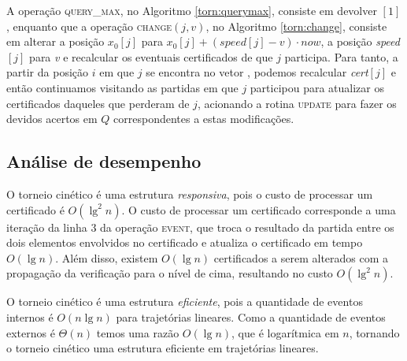



A operação \textsc{query\_max}, no Algoritmo \ref{torn:querymax},
consiste em devolver \torneio$[1]$, enquanto que a operação
\textsc{change}$(j, v)$, no Algoritmo \ref{torn:change}, consiste em
alterar a posição $x_0[j]$ para ${x_0[j] + (\mathit{speed}[j] -
v)\cdot now}$, a posição \textit{speed}$[j]$ para \textit{v} e
recalcular os eventuais certificados de que $j$ participa. Para
tanto, a partir da posição $i$ em que $j$ se encontra no vetor
\torneio, podemos recalcular \textit{cert}$[j]$ e então continuamos
visitando as partidas em que $j$ participou para atualizar os
certificados daqueles que perderam de $j$, acionando a rotina
\textsc{update} para fazer os devidos acertos em $Q$ correspondentes
a estas modificações.









\FloatBarrier
\subsection{Análise de desempenho}

O torneio cinético é uma estrutura \textit{responsiva}, pois o custo de
processar um certificado é $O(\lg^2{n})$. O custo de processar um certificado
corresponde a uma iteração da linha $3$ da operação \textsc{event}, que troca o
resultado da partida entre os dois elementos envolvidos no certificado e
atualiza o certificado em tempo $O(\lg{n})$. Além disso, existem $O(\lg{n})$
certificados a serem alterados com a propagação da verificação para o nível de
cima, resultando no custo $O(\lg^2{n})$.

O torneio cinético é uma estrutura \textit{eficiente}, pois a quantidade de
eventos internos é $O(n\lg{n})$ para trajetórias lineares. Como a quantidade de
eventos externos é $\Theta(n)$ temos uma razão $O(\lg{n})$, que é logarítmica em
$n$, tornando o torneio cinético uma estrutura eficiente em trajetórias
lineares.

